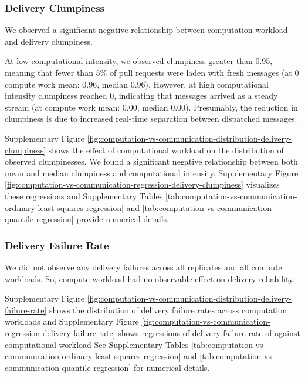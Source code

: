 \subsubsection{Delivery Clumpiness}

We observed a significant negative relationship between computation workload and delivery clumpiness.

At low computational intensity, we observed clumpiness greater than 0.95, meaning that fewer than 5\% of pull requests were laden with fresh messages (at 0 compute work mean: 0.96, median 0.96).
However, at high computational intensity clumpiness reached 0, indicating that messages arrived as a steady stream (at  compute work mean: 0.00, median 0.00).
Presumably, the reduction in clumpiness is due to increased real-time separation between dispatched messages.

Supplementary Figure \ref{fig:computation-vs-communication-distribution-delivery-clumpiness} shows the effect of computational workload on the distribution of observed clumpinesses.
We found a significant negative relationship between both mean and median clumpiness and computational intensity.
Supplementary Figure \ref{fig:computation-vs-communication-regression-delivery-clumpiness} visualizes these regressions and Supplementary Tables \ref{tab:computation-vs-communication-ordinary-least-squares-regression} and \ref{tab:computation-vs-communication-quantile-regression} provide numerical details.

\subsubsection{Delivery Failure Rate}

We did not observe any delivery failures across all replicates and all compute workloads.
So, compute workload had no observable effect on delivery reliability.

Supplementary Figure \ref{fig:computation-vs-communication-distribution-delivery-failure-rate} shows the distribution of delivery failure rates across computation workloads and Supplementary Figure \ref{fig:computation-vs-communication-regression-delivery-failure-rate} shows regressions of delivery failure rate of against computational workload
See Supplementary Tables \ref{tab:computation-vs-communication-ordinary-least-squares-regression} and \ref{tab:computation-vs-communication-quantile-regression} for numerical details.

